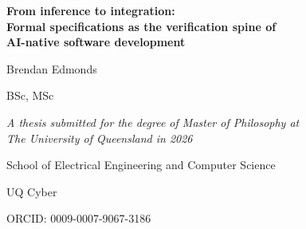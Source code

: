 \thispagestyle{empty}
\begin{center}
\vspace*{1cm}

{\LARGE\bfseries From inference to integration:\\[0.4em]
Formal specifications as the verification spine of\\[0.2em]
AI-native software development\par}

\vspace{2.5cm}

{\large Brendan Edmonds\par}
\vspace{0.4em}
{\normalsize BSc, MSc\par}%

\vspace{2.5cm}

{\normalsize\itshape A thesis submitted for the degree of Master of Philosophy at\\
The University of Queensland in 2026\par}%

\vspace{2.0cm}

{\normalsize School of Electrical Engineering and Computer Science\par}
{\normalsize UQ Cyber\par}

\vfill

{\small ORCID: 0009-0007-9067-3186\par}

\end{center}
\clearpage
